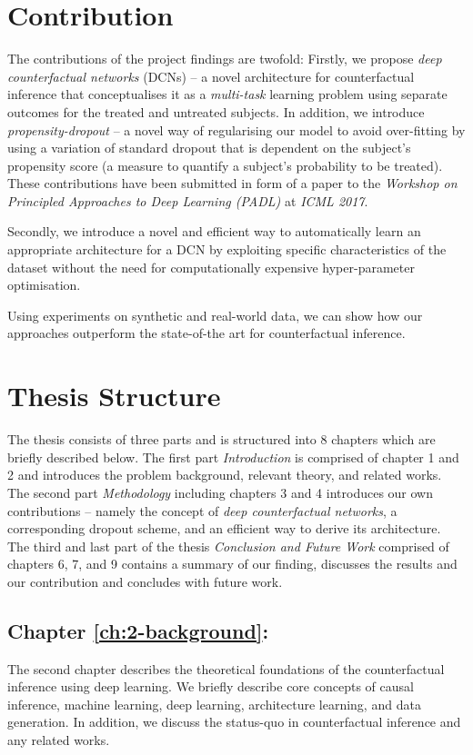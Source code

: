 \section{Contribution}
The contributions of the project findings are twofold: 
Firstly, we propose \emph{deep counterfactual networks} (DCNs) -- a novel architecture for counterfactual inference  that conceptualises it as a \emph{multi-task} learning problem using separate outcomes for the treated and untreated subjects. In addition, we introduce \emph{propensity-dropout} -- a novel way of regularising our model to avoid over-fitting by using a variation of standard dropout %
that is dependent on the subject's propensity score (a measure to quantify a subject's probability to be treated). These contributions have been submitted in form of a paper to  the \emph{Workshop on Principled Approaches to Deep Learning (PADL)} at \emph{ICML 2017}. 

Secondly, we introduce a novel and efficient way to automatically learn an appropriate architecture for a DCN by exploiting specific characteristics of the dataset without the need for computationally expensive hyper-parameter optimisation. 

Using experiments on synthetic and real-world data, we can show how our approaches outperform the state-of-the art for counterfactual inference. 



\section{Thesis Structure}
The thesis consists of three parts and is structured into 8 %
chapters which are briefly described below. The first part \emph{Introduction} is comprised of chapter 1 and 2 and introduces the problem background, relevant theory, and related works. The second part \emph{Methodology} including chapters 3 and 4 introduces our own contributions -- namely the concept of \emph{deep counterfactual networks}, a corresponding dropout scheme, and an efficient way to derive its architecture. The third and last part of the thesis \emph{Conclusion and Future Work} comprised of chapters 6, 7, and 9 contains a summary of our finding, discusses the results and our contribution and concludes with future work. 

\subsection*{Chapter \ref{ch:2-background}: }
The second chapter describes the theoretical foundations of the counterfactual inference using deep learning. We briefly describe core concepts of causal inference, machine learning, deep learning, architecture learning, and data generation. 
In addition, we discuss the status-quo in counterfactual inference and any related works. 

